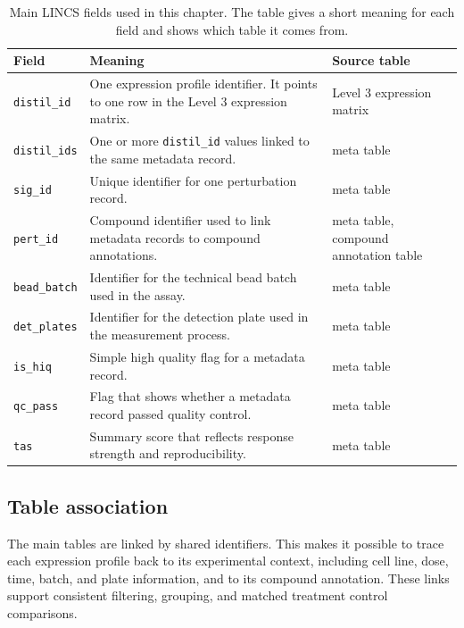 \begin{table}[htbp]
    \centering
    \caption[Main LINCS Fields]{Main LINCS fields used in this chapter. The table gives a short meaning for each field and shows which table it comes from.}
    \label{tab:lincs_key_fields}
    \begin{tabular}{>{\raggedright\arraybackslash}p{2.2cm}>{\raggedright\arraybackslash}p{7.1cm}>{\raggedright\arraybackslash}p{3.0cm}}
        \hline
        Field & Meaning & Source table \\
        \hline
        \texttt{distil\_id} & One expression profile identifier. It points to one row in the Level 3 expression matrix. & Level 3 expression matrix \\
        \texttt{distil\_ids} & One or more \texttt{distil\_id} values linked to the same metadata record. & meta table \\
        \texttt{sig\_id} & Unique identifier for one perturbation record. & meta table \\
        \texttt{pert\_id} & Compound identifier used to link metadata records to compound annotations. & meta table, compound annotation table \\
        \texttt{bead\_batch} & Identifier for the technical bead batch used in the assay. & meta table \\
        \texttt{det\_plates} & Identifier for the detection plate used in the measurement process. & meta table \\
        \texttt{is\_hiq} & Simple high quality flag for a metadata record. & meta table \\
        \texttt{qc\_pass} & Flag that shows whether a metadata record passed quality control. & meta table \\
        \texttt{tas} & Summary score that reflects response strength and reproducibility. & meta table \\
        \hline
    \end{tabular}
\end{table}

\subsection{Table association}
\noindent The main tables are linked by shared identifiers. This makes it possible to trace each expression profile back to its experimental context, including cell line, dose, time, batch, and plate information, and to its compound annotation. These links support consistent filtering, grouping, and matched treatment control comparisons.

